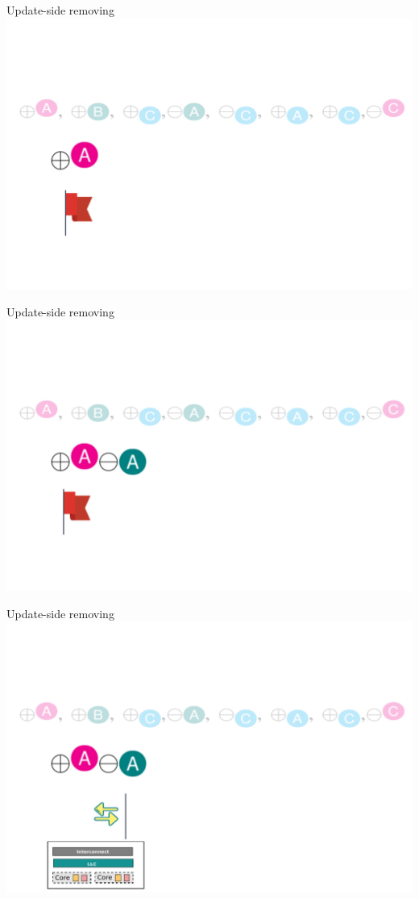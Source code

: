 \documentclass[english]{beamer} %
\begin{document}
\begin{frame}{Update-side removing}
\includegraphics[scale=0.5]{fig/update_remove_1}
\end{frame}

\begin{frame}{Update-side removing}
\includegraphics[scale=0.5]{fig/update_remove_2}
\end{frame}


\begin{frame}{Update-side removing}
\includegraphics[scale=0.5]{fig/update_remove_2-1}
\end{frame}
\end{document}
